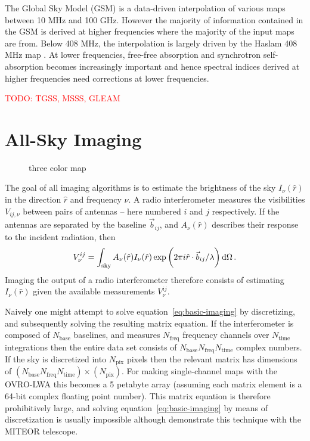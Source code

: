 \documentclass[twocolumn]{aastex6}
\renewcommand{\d}{{\rm d}}
\newcommand{\todo}[1]{\textcolor{red}{TODO: #1}\PackageWarning{TODO:}{#1!}}
\begin{document}
The Global Sky Model (GSM) \citep{2008MNRAS.388..247D, 2017MNRAS.464.3486Z} is a data-driven
interpolation of various maps between 10 MHz and 100 GHz. However the majority of information
contained in the GSM is derived at higher frequencies where the majority of the input maps are from.
Below 408 MHz, the interpolation is largely driven by the Haslam 408 MHz map
\citep{1981A&A...100..209H, 1982A&AS...47....1H}.  At lower frequencies, free-free absorption and
synchrotron self-absorption becomes increasingly important and hence spectral indices derived at
higher frequencies need corrections at lower frequencies.





\citet{2011A&A...525A.138G}


\todo{TGSS, MSSS, GLEAM}

\section{All-Sky Imaging}

\begin{figure*}[ht]
    \caption{three color map}
    \label{fig:rgb}
\end{figure*}

The goal of all imaging algorithms is to estimate the brightness of the sky $I_\nu(\hat r)$ in the
direction $\hat r$ and frequency $\nu$. A radio interferometer measures the visibilities
$V_{ij,\nu}$ between pairs of antennas -- here numbered $i$ and $j$ respectively. If the antennas
are separated by the baseline $\vec b_{ij}$, and $A_\nu(\hat r)$ describes their response to the
incident radiation, then
\begin{equation}\label{eq:basic-imaging}
    V^{ij}_\nu = \int_\text{sky}
                 A_\nu(\hat r) I_\nu(\hat r)
                 \exp\bigg(2\pi i \hat r\cdot\vec b_{ij}/\lambda\bigg) \,\d\Omega \, .
\end{equation}
Imaging the output of a radio interferometer therefore consists of estimating $I_\nu(\hat r)$ given
the available measurements $V^{ij}_\nu$.

Naively one might attempt to solve equation~\ref{eq:basic-imaging} by discretizing, and subsequently
solving the resulting matrix equation. If the interferometer is composed of $N_\text{base}$
baselines, and measures $N_\text{freq}$ frequency channels over $N_\text{time}$ integrations then
the entire data set consists of $N_\text{base}N_\text{freq}N_\text{time}$ complex numbers. If the
sky is discretized into $N_\text{pix}$ pixels then the relevant matrix has dimensions of
$(N_\text{base}N_\text{freq}N_\text{time})\times(N_\text{pix})$. For making single-channel maps with
the OVRO-LWA this becomes a 5 petabyte array (assuming each matrix element is a 64-bit complex
floating point number).  This matrix equation is therefore prohibitively large, and solving
equation~\ref{eq:basic-imaging} by means of discretization is usually impossible although
\citet{2017MNRAS.465.2901Z} demonstrate this technique with the MITEOR telescope.
\end{document}
